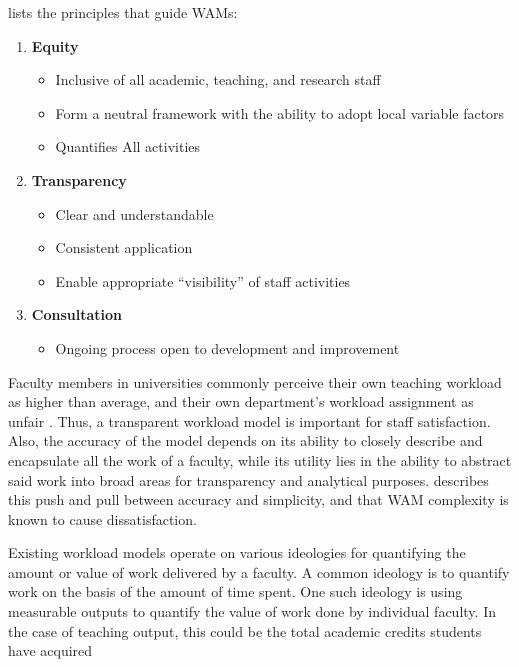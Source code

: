 \cite{trac2011} lists the principles that guide WAMs:

\begin{enumerate}
    \item \textbf{Equity}

          \begin{itemize}
              \item{Inclusive of all academic, teaching, and research staff}
              \item{Form a neutral framework with the ability to adopt local variable factors}
              \item{Quantifies All activities}
          \end{itemize}
    \item \textbf{Transparency}
          \begin{itemize}
              \item{Clear and understandable}
              \item{Consistent application}
              \item{Enable appropriate “visibility” of staff activities}
          \end{itemize}
    \item \textbf{Consultation}
          \begin{itemize}
              \item{Ongoing process open to development and improvement}
          \end{itemize}
\end{enumerate}

Faculty members in universities commonly perceive their own teaching workload as higher than average, and their own department’s workload assignment as unfair \cite{2018exploring}. Thus, a transparent workload model is important for staff satisfaction. Also, the accuracy of the model depends on its ability to closely describe and encapsulate all the work of a faculty, while its utility lies in the ability to abstract said work into broad areas for transparency and analytical purposes. \cite{vardi2009impacts} describes this push and pull between accuracy and simplicity, and that WAM complexity is known to cause dissatisfaction.

Existing workload models operate on various ideologies for quantifying the amount or value of work delivered by a faculty. A common ideology is to quantify work on the basis of the amount of time spent. One such ideology is using measurable outputs to quantify the value of work done by individual faculty. In the case of teaching output, this could be the total academic credits students have acquired \cite{trac2011}

